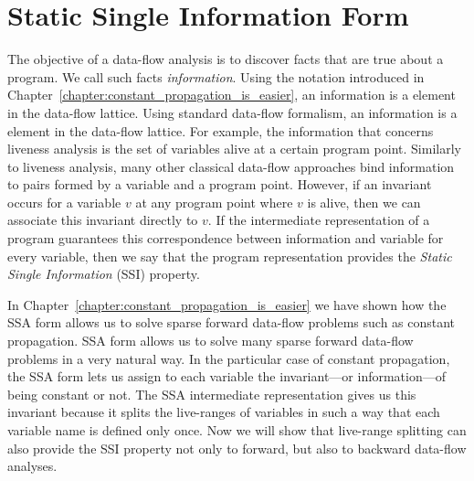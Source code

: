\chapter{Static Single Information Form }
\label{chapter:ssi}

{
\def\progpoint{program point\xspace}
\def\progpoints{program points\xspace}
\def\splitpoint{control-flow point\xspace}
\def\splitpoints{control-flow points\xspace}
\def\psplit{\emph{Split}\xspace}
\def\pinfo{\emph{Info}\xspace}
\def\plink{\emph{Link}\xspace}
\def\pversion{\emph{Version}\xspace}

\label{sec:ssi:pereira:intro}

The objective of a data-flow analysis is to discover facts that are true about a
program.
We call such facts {\em information}.
\ifconstantprop
Using the notation introduced in Chapter~\ref{chapter:constant_propagation_is_easier}, an information is a element in the data-flow lattice.
\else
Using standard data-flow formalism, an information is a element in the data-flow lattice.
\fi
For example, the information that concerns liveness analysis is the set of
variables alive at a certain \progpoint.
Similarly to liveness analysis, many other classical data-flow approaches bind
information to pairs formed by a variable and a \progpoint.
However, if an invariant occurs for a variable $v$ at any \progpoint where
$v$ is alive, then we can associate this invariant directly to $v$.
If the intermediate representation of a program guarantees this correspondence 
between
information and variable for every variable, then we say that the program
representation provides the {\em Static Single Information} (SSI) property.

\ifconstantprop
In Chapter~\ref{chapter:constant_propagation_is_easier} we have shown how the 
SSA form allows us to solve sparse forward data-flow problems such as constant 
propagation.
\else
SSA form allows us to solve many sparse forward data-flow problems in a very natural way.
\fi
In the particular case of constant propagation, the SSA form lets us assign to 
each variable the invariant---or information---of being constant or not.
The SSA intermediate representation gives us this invariant because it splits 
the live-ranges of variables in such a way that each variable name is defined 
only once.
Now we will show that live-range splitting can also provide the SSI property not only to forward, but also to backward data-flow analyses.

}
